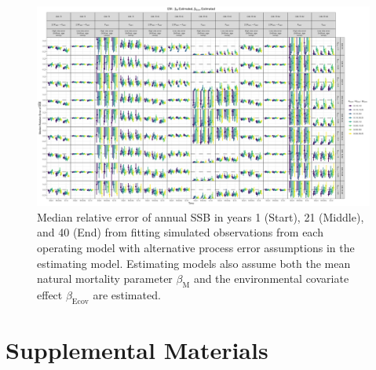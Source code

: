 \documentclass[
  12pt,
]{article}
\begin{document}
\begin{landscape}
\begin{figure}
\caption{Median relative error of annual SSB in years 1 (Start), 21 (Middle), and 40 (End) from fitting simulated observations from each operating model with alternative process error assumptions in the estimating model. Estimating models also assume both the mean natural mortality parameter $\beta_\text{M}$ and the environmental covariate effect $\beta_\text{Ecov}$ are estimated.}\label{SSB_bias_M_estimated_beta_estimated}
\begin{center}
\includegraphics[height = \textheight]{SSB_bias_all_PE_effect_M_estimated_beta_estimated.png}
\end{center}
\end{figure}
\end{landscape}

\hypertarget{supplemental-materials}{%
\section*{Supplemental Materials}\label{supplemental-materials}}
\end{document}
